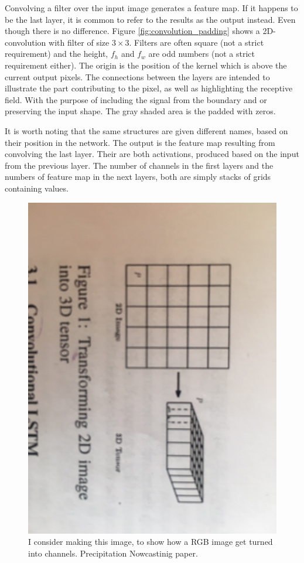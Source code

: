 \documentclass{article}
\begin{document}

Convolving a filter over the input image generates a feature map. If it happens to be the last layer, it is common to refer to the results as the output instead. Even though there is no difference. Figure \ref{fig:convolution_padding} shows a 2D-convolution with filter of size $3\times 3$. Filters are often square (not a strict requirement) and the height, $f_h$ and $f_w$ are odd numbers (not a strict requirement either). The origin is the position of the kernel which is above the current output pixels. The connections between the layers are intended to illustrate the part contributing to the pixel, as well as highlighting the receptive field. With the purpose of including the signal from the boundary and or preserving the input shape. The gray shaded area is the padded with zeros. 

It is worth noting that the same structures are given different names, based on their position in the network. The output is the feature map resulting from convolving the last layer. Their are both activations, produced based on the input from the previous layer. The number of channels in the first layers and the numbers of feature map in the next layers, both are simply stacks of grids containing values.
\begin{figure}
    \centering
    \includegraphics[scale = 0.4]{image_2_3D_tensor.JPG}
    \caption{I consider making this image, to show how a RGB image get turned into channels. Precipitation Nowcastinig paper.}
    \label{fig:RGB_image}
\end{figure}
\end{document}
